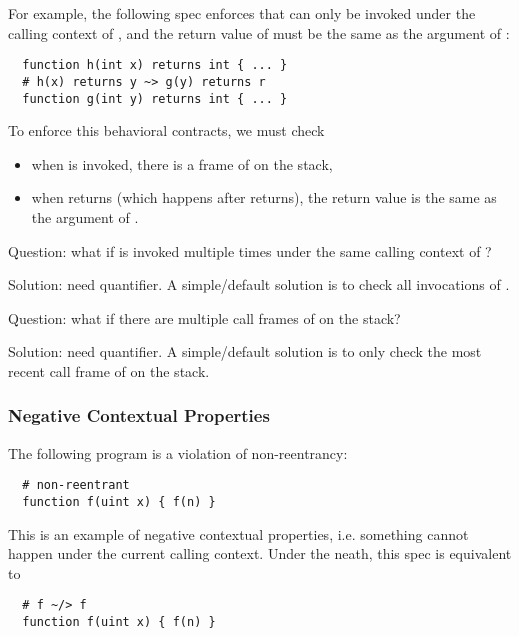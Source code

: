 For example, the following spec enforces that  can only be invoked
under the calling context of , and the return value of  must be
the same as the argument of :

\begin{lstlisting}
  function h(int x) returns int { ... }
  # h(x) returns y ~> g(y) returns r
  function g(int y) returns int { ... }
\end{lstlisting}

To enforce this behavioral contracts, we must check
\begin{itemize}
	\item when  is invoked, there is a frame of  on the stack,
	\item when  returns (which happens after  returns), the return value
	      is the same as the argument of .
\end{itemize}

Question: what if  is invoked multiple times under the same calling context of
?

Solution: need quantifier. A simple/default solution is to check all
invocations of .

Question: what if there are multiple call frames of  on the stack?

Solution: need quantifier. A simple/default solution is to only check
the most recent call frame of  on the stack.


\subsubsection{Negative Contextual Properties}

The following program is a violation of non-reentrancy:

\begin{lstlisting}
  # non-reentrant
  function f(uint x) { f(n) }
\end{lstlisting}

This is an example of negative contextual properties, i.e. something cannot
happen under the current calling context. Under the neath, this spec is
equivalent to

\begin{lstlisting}
  # f ~/> f
  function f(uint x) { f(n) }
\end{lstlisting}

